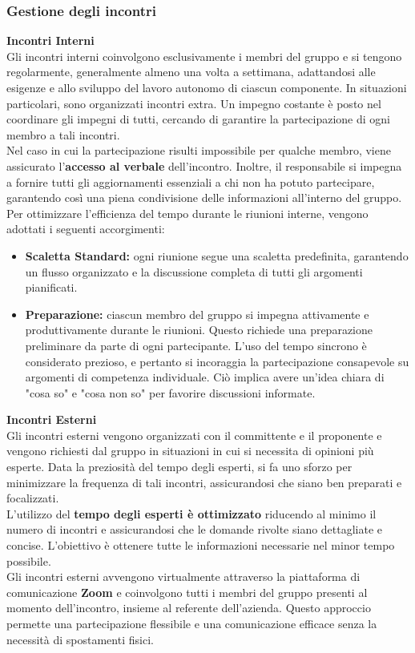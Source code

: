 \documentclass{article}
\begin{document}
\subsubsection{Gestione degli incontri}
\textbf{Incontri Interni}\\
Gli incontri interni coinvolgono esclusivamente i membri del gruppo e si tengono regolarmente, generalmente almeno una volta a settimana, adattandosi alle esigenze e allo sviluppo del lavoro autonomo di ciascun componente. In situazioni particolari, sono organizzati incontri extra. Un impegno costante è posto nel coordinare gli impegni di tutti, cercando di garantire la partecipazione di ogni membro a tali incontri.\\
Nel caso in cui la partecipazione risulti impossibile per qualche membro, viene assicurato l'\textbf{accesso al verbale} dell'incontro. Inoltre, il responsabile si impegna a fornire tutti gli aggiornamenti essenziali a chi non ha potuto partecipare, garantendo così una piena condivisione delle informazioni all'interno del gruppo.\\
Per ottimizzare l'efficienza del tempo durante le riunioni interne, vengono adottati i seguenti accorgimenti:
\begin{itemize}
    \item \textbf{Scaletta Standard:} ogni riunione segue una scaletta predefinita, garantendo un flusso organizzato e la discussione completa di tutti gli argomenti pianificati.
    \item \textbf{Preparazione:} ciascun membro del gruppo si impegna attivamente e produttivamente durante le riunioni. Questo richiede una preparazione preliminare da parte di ogni partecipante. L'uso del tempo sincrono è considerato prezioso, e pertanto si incoraggia la partecipazione consapevole su argomenti di competenza individuale. Ciò implica avere un'idea chiara di "cosa so" e "cosa non so" per favorire discussioni informate.
\end{itemize}
\textbf{Incontri Esterni}\\
Gli incontri esterni vengono organizzati con il committente e il proponente e vengono richiesti dal gruppo in situazioni in cui si necessita di opinioni più esperte. Data la preziosità del tempo degli esperti, si fa uno sforzo per minimizzare la frequenza di tali incontri, assicurandosi che siano ben preparati e focalizzati.\\ 
L'utilizzo del \textbf{tempo degli esperti è ottimizzato} riducendo al minimo il numero di incontri e assicurandosi che le domande rivolte siano dettagliate e concise. L'obiettivo è ottenere tutte le informazioni necessarie nel minor tempo possibile.\\
Gli incontri esterni avvengono virtualmente attraverso la piattaforma di comunicazione \textbf{Zoom} e coinvolgono tutti i membri del gruppo presenti al momento dell'incontro, insieme al referente dell'azienda. Questo approccio permette una partecipazione flessibile e una comunicazione efficace senza la necessità di spostamenti fisici.\\\\
\end{document}
